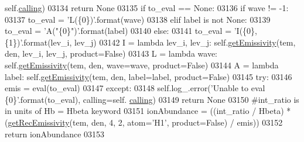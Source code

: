 \begin{DoxyCode}
      self.\hyperlink{classpyneb_1_1core_1_1pynebcore_1_1_rec_atom_a82ec425ebba32b73a5d9ae52717d47c4}{calling})
03134             \textcolor{keywordflow}{return} \textcolor{keywordtype}{None}
03135         \textcolor{keywordflow}{if} to\_eval == \textcolor{keywordtype}{None}:
03136             \textcolor{keywordflow}{if} wave != -1:
03137                 to\_eval = \textcolor{stringliteral}{'L(\{0\})'}.format(wave)
03138             \textcolor{keywordflow}{elif} label \textcolor{keywordflow}{is} \textcolor{keywordflow}{not} \textcolor{keywordtype}{None}:
03139                 to\_eval = \textcolor{stringliteral}{'A("\{0\}")'}.format(label)
03140             \textcolor{keywordflow}{else}:
03141                 to\_eval = \textcolor{stringliteral}{'I(\{0\}, \{1\})'}.format(lev\_i, lev\_j)
03142         I = \textcolor{keyword}{lambda} lev\_i, lev\_j: self.\hyperlink{classpyneb_1_1core_1_1pynebcore_1_1_rec_atom_ac03957666aff1955387fcc03c6187ad3}{getEmissivity}(tem, den, lev\_i, lev\_j, product=\textcolor{keyword}{False})
03143         L = \textcolor{keyword}{lambda} wave: self.\hyperlink{classpyneb_1_1core_1_1pynebcore_1_1_rec_atom_ac03957666aff1955387fcc03c6187ad3}{getEmissivity}(tem, den, wave=wave, product=\textcolor{keyword}{False})
03144         A = \textcolor{keyword}{lambda} label: self.\hyperlink{classpyneb_1_1core_1_1pynebcore_1_1_rec_atom_ac03957666aff1955387fcc03c6187ad3}{getEmissivity}(tem, den, label=label, product=\textcolor{keyword}{False})
03145         \textcolor{keywordflow}{try}:
03146             emis = eval(to\_eval)
03147         \textcolor{keywordflow}{except}:
03148             self.log\_.error(\textcolor{stringliteral}{'Unable to eval \{0\}'}.format(to\_eval), calling=self.
      \hyperlink{classpyneb_1_1core_1_1pynebcore_1_1_rec_atom_a82ec425ebba32b73a5d9ae52717d47c4}{calling})
03149             \textcolor{keywordflow}{return} \textcolor{keywordtype}{None}
03150         \textcolor{comment}{#int\_ratio is in units of Hb = Hbeta keyword}
03151         ionAbundance = ((int\_ratio / Hbeta) * (\hyperlink{namespacepyneb_1_1core_1_1pynebcore_aba9d4a5306330dd47f8a51455514c017}{getRecEmissivity}(tem, den, 4, 2, atom=\textcolor{stringliteral}{'H1'}, 
      product=\textcolor{keyword}{False}) / emis))
03152         \textcolor{keywordflow}{return} ionAbundance
03153     
    
\end{DoxyCode}
